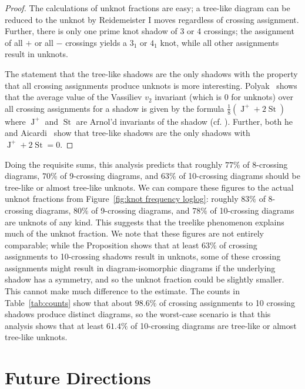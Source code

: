 \documentclass[amsmath,secnumarabic,floatfix,amssymb,nofootinbib,nobibnotes,letterpaper,11pt,tightenlines,showkeys]{revtex4}
\theoremstyle{definition}
\begin{document}
\begin{proof}
The calculations of unknot fractions are easy; a tree-like diagram can be reduced to the unknot by Reidemeister I moves regardless of crossing assignment. Further, there is only one prime knot shadow of 3 or 4 crossings; the assignment of all $+$ or all $-$ crossings yields a $3_1$ or $4_1$ knot, while all other assignments result in unknots.

The statement that the tree-like shadows are the only shadows with the property that all crossing assignments produce unknots is more interesting. Polyak~\cite{Polyak:1998wa} shows that the average value of the Vassiliev $v_2$ invariant (which is $0$ for unknots) over all crossing assignments for a shadow is given by the formula $\frac{1}{8}(\operatorname{J}^+ + 2 \operatorname{St})$ where $\operatorname{J}^+$ and $\operatorname{St}$ are Arnol'd invariants of the shadow (cf. \cite{Arnold:1994wr}). Further, both he and Aicardi~\cite{Aicardi:1994uq} show that tree-like shadows are the only shadows with $\operatorname{J}^+ + 2 \operatorname{St} = 0$. 
\end{proof}

Doing the requisite sums, this analysis predicts that roughly $77\%$ of 8-crossing diagrams, $70\%$ of 9-crossing diagrams, and $63\%$ of 10-crossing diagrams should be tree-like or almost tree-like unknots. We can compare these figures to the actual unknot fractions from Figure~\ref{fig:knot frequency loglog}: roughly $83\%$ of 8-crossing diagrams, $80\%$ of 9-crossing diagrams, and $78\%$ of 10-crossing diagrams are unknots of any kind. This suggests that the treelike phenomenon explains much of the unknot fraction. We note that these figures are not entirely comparable; while the Proposition shows that at least $63\%$ of crossing assignments to 10-crossing shadows result in unknots, some of these crossing assignments might result in diagram-isomorphic diagrams if the underlying shadow has a symmetry, and so the unknot fraction could be slightly smaller. This cannot make much difference to the estimate. The counts in Table~\ref{tab:counts} show that about $98.6\%$ of crossing assignments to 10 crossing shadows produce distinct diagrams, so the worst-case scenario is that this analysis shows that at least $61.4\%$ of 10-crossing diagrams are tree-like or almost tree-like unknots.

\section{Future Directions}
\end{document}
